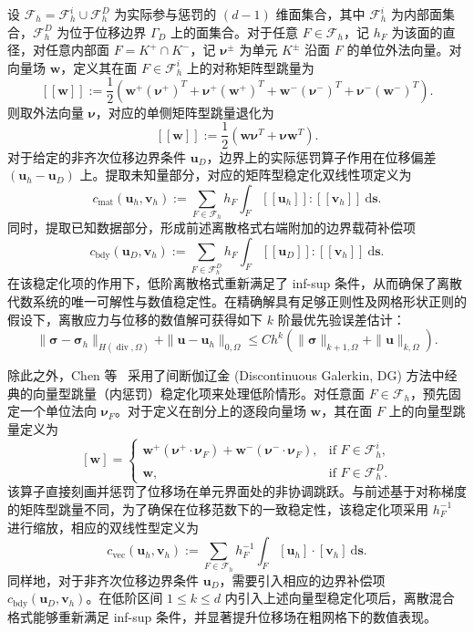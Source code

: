 设 $\mathcal{F}_h = \mathcal{F}_h^{i}\cup\mathcal{F}_h^{D}$ 为实际参与惩罚的 $(d-1)$ 维面集合，其中 $\mathcal{F}_h^{i}$ 为内部面集合，$\mathcal{F}_h^{D}$ 为位于位移边界 $\Gamma_D$ 上的面集合。对于任意 $F \in \mathcal{F}_h$，记 $h_F$ 为该面的直径，对任意内部面 $F = K^+\cap K^-$，记 $\boldsymbol{\nu}^{\pm}$ 为单元 $K^{\pm}$ 沿面 $F$ 的单位外法向量。对向量场 $\boldsymbol{w}$，定义其在面 $F \in \mathcal{F}_h^i$ 上的对称矩阵型跳量为
\[
[\![ \boldsymbol{w} ]\!] := \frac{1}{2}(\boldsymbol{w}^+(\boldsymbol{\nu}^+)^T + \boldsymbol{\nu}^+(\boldsymbol{w}^+)^T + \boldsymbol{w}^-(\boldsymbol{\nu}^-)^T + \boldsymbol{\nu}^-(\boldsymbol{w}^-)^T).
\] 
则取外法向量 $\boldsymbol{\nu}$，对应的单侧矩阵型跳量退化为
\[
[\![ \boldsymbol{w} ]\!] := \frac{1}{2}(\boldsymbol{w}\boldsymbol{\nu}^T + \boldsymbol{\nu}\boldsymbol{w}^T).
\]
对于给定的非齐次位移边界条件 $\boldsymbol{u}_D$，边界上的实际惩罚算子作用在位移偏差 $(\boldsymbol{u}_h - \boldsymbol{u}_D)$ 上。提取未知量部分，对应的矩阵型稳定化双线性项定义为
\[
c_{\text{mat}}(\boldsymbol{u}_h, \boldsymbol{v}_h) := \sum_{F \in \mathcal{F}_h} h_F \int_{F} [\![ \boldsymbol{u}_h ]\!] : [\![ \boldsymbol{v}_h ]\!] ~\mathrm{d}\boldsymbol{s}.
\]
同时，提取已知数据部分，形成前述离散格式右端附加的边界载荷补偿项
\[
c_{\text{bdy}}(\boldsymbol{u}_D, \boldsymbol{v}_h) := \sum_{F \in \mathcal{F}_h^D} h_F \int_{F} [\![ \boldsymbol{u}_D ]\!] : [\![ \boldsymbol{v}_h ]\!] ~\mathrm{d}\boldsymbol{s}.
\]
在该稳定化项的作用下，低阶离散格式重新满足了 inf-sup 条件，从而确保了离散代数系统的唯一可解性与数值稳定性。在精确解具有足够正则性及网格形状正则的假设下，离散应力与位移的数值解可获得如下 $k$ 阶最优先验误差估计：
\[
\|\boldsymbol{\sigma} - \boldsymbol{\sigma}_h\|_{H(\operatorname{div},\Omega)} + \|\boldsymbol{u} - \boldsymbol{u}_h\|_{0,\Omega} \le C h^k (\|\boldsymbol{\sigma}\|_{k+1,\Omega} + \|\boldsymbol{u}\|_{k,\Omega}).
\]

除此之外，Chen 等~\cite{chenFastAuxiliarySpace2017a} 采用了间断伽辽金 (Discontinuous Galerkin, DG) 方法中经典的向量型跳量（内惩罚）稳定化项来处理低阶情形。对任意面 $F\in\mathcal{F}_h$，预先固定一个单位法向 $\boldsymbol{\nu}_F$。对于定义在剖分上的逐段向量场 $\boldsymbol{w}$，其在面 $F$ 上的向量型跳量定义为
\[
[\boldsymbol{w}] =  
\begin{cases} 
	\boldsymbol{w}^+(\boldsymbol{\nu}^+\cdot\boldsymbol{\nu}_F) + \boldsymbol{w}^-(\boldsymbol{\nu}^-\cdot\boldsymbol{\nu}_F), & \text{if } F \in \mathcal{F}_h^i, \\ 
	\boldsymbol{w}, & \text{if } F \in \mathcal{F}_h^{D}. 
\end{cases}
\]
该算子直接刻画并惩罚了位移场在单元界面处的非协调跳跃。与前述基于对称梯度的矩阵型跳量不同，为了确保在位移范数下的一致稳定性，该稳定化项采用 $h_F^{-1}$ 进行缩放，相应的双线性型定义为
\[
c_{\text{vec}}(\boldsymbol{u}_h, \boldsymbol{v}_h) := \sum_{F \in \mathcal{F}_h} h_F^{-1}\int_{F} [\boldsymbol{u}_h] \cdot [\boldsymbol{v}_h] ~ \mathrm{d}\boldsymbol{s}.
\]
同样地，对于非齐次位移边界条件 $\boldsymbol{u}_D$，需要引入相应的边界补偿项 $c_{\text{bdy}}(\boldsymbol{u}_D, \boldsymbol{v}_h)$。在低阶区间 $1 \le k \le d$ 内引入上述向量型稳定化项后，离散混合格式能够重新满足 inf-sup 条件，并显著提升位移场在粗网格下的数值表现。

